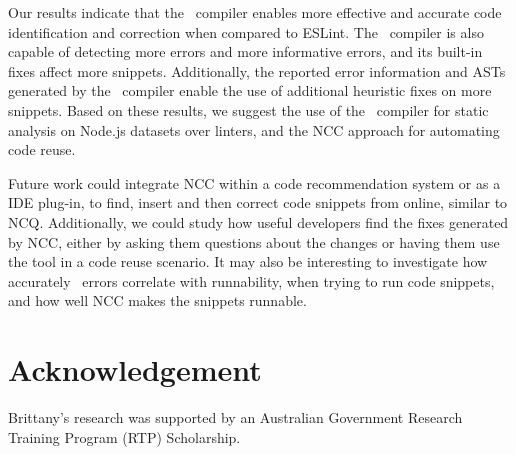 \documentclass[conference]{IEEEtran}
\begin{document}
Our results indicate that the \ts\ compiler enables more effective and accurate code identification and correction when compared to ESLint. The \ts\ compiler is also capable of detecting more errors and more informative errors, and its built-in fixes affect more snippets. Additionally, the reported error information and ASTs generated by the \ts\ compiler enable the use of additional heuristic fixes on more snippets. Based on these results, we suggest the use of the \ts\ compiler for static analysis on Node.js datasets over linters, and the NCC approach for automating code reuse.

Future work could integrate NCC within a code recommendation system or as a IDE plug-in, to find, insert and then correct code snippets from online, similar to NCQ. Additionally, we could study how useful developers find the fixes generated by NCC, either by asking them questions about the changes or having them use the tool in a code reuse scenario. It may also be interesting to investigate how accurately \ts\ errors correlate with runnability, when trying to run code snippets, and how well NCC makes the snippets runnable.

\section*{Acknowledgement}

Brittany’s research was supported by an Australian Government Research Training Program (RTP) Scholarship. 



\end{document}
